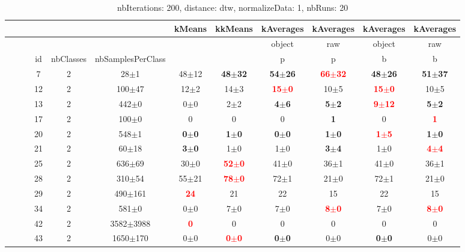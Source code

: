   
\begin{table} 
\begin{center} 
\small 
 \setlength{\tabcolsep}{.16667em} 
\begin{tabular}{lllccccccccc} 
 &  &  &  &  &  & kMeans & kkMeans & kAverages & kAverages & kAverages & kAverages \\ 
\hline 
 &  &  &  &  &  &  &  & object & raw & object & raw \\ 
 &  &  & id & nbClasses & nbSamplesPerClass &  &  & p & p & b & b \\ 
 &  &  &  7 & 2 &      28$\pm$1 & 48$\pm$12 & \textbf{48$\pm$32} & \textbf{54$\pm$26} & \textbf{\textcolor{red}{66$\pm$32}} & \textbf{48$\pm$26} & \textbf{51$\pm$37} \\ 
 &  &  & 12 & 2 &    100$\pm$47 & 12$\pm$2 & 14$\pm$3 & \textbf{\textcolor{red}{15$\pm$0}} & 10$\pm$5 & \textbf{\textcolor{red}{15$\pm$0}} & 10$\pm$5 \\ 
 &  &  & 13 & 2 &     442$\pm$0 &  0$\pm$0 &  2$\pm$2 & \textbf{ 4$\pm$6} & \textbf{ 5$\pm$2} & \textbf{\textcolor{red}{9$\pm$12}} & \textbf{ 5$\pm$2} \\ 
 &  &  & 17 & 2 &     100$\pm$0 & 0 & 0 & 0 & \textbf{1} & 0 & \textbf{\textcolor{red}{1}} \\ 
 &  &  & 20 & 2 &     548$\pm$1 & \textbf{0$\pm$0} & \textbf{1$\pm$0} & \textbf{0$\pm$0} & \textbf{1$\pm$0} & \textbf{\textcolor{red}{1$\pm$5}} & \textbf{1$\pm$0} \\ 
 &  &  & 21 & 2 &     60$\pm$18 & \textbf{3$\pm$0} & 1$\pm$0 & 1$\pm$0 & \textbf{3$\pm$4} & 1$\pm$0 & \textbf{\textcolor{red}{4$\pm$4}} \\ 
 &  &  & 25 & 2 &    636$\pm$69 & 30$\pm$0 & \textbf{\textcolor{red}{52$\pm$0}} & 41$\pm$0 & 36$\pm$1 & 41$\pm$0 & 36$\pm$1 \\ 
 &  &  & 28 & 2 &    310$\pm$54 & 55$\pm$21 & \textbf{\textcolor{red}{ 78$\pm$0}} &  72$\pm$1 &  21$\pm$0 &  72$\pm$1 &  21$\pm$0 \\ 
 &  &  & 29 & 2 &   490$\pm$161 & \textbf{\textcolor{red}{24}} & 21 & 22 & 15 & 22 & 15 \\ 
 &  &  & 34 & 2 &     581$\pm$0 & 0$\pm$0 & 7$\pm$0 & 7$\pm$0 & \textbf{\textcolor{red}{8$\pm$0}} & 7$\pm$0 & \textbf{\textcolor{red}{8$\pm$0}} \\ 
 &  &  & 42 & 2 & 3582$\pm$3988 & \textbf{\textcolor{red}{0}} & 0 & 0 & 0 & 0 & 0 \\ 
 &  &  & 43 & 2 &  1650$\pm$170 & 0$\pm$0 & \textbf{\textcolor{red}{0$\pm$0}} & \textbf{0$\pm$0} & 0$\pm$0 & \textbf{0$\pm$0} & 0$\pm$0 \\ 
\end{tabular} 
\end{center} 
\caption{nbIterations: 200, distance: dtw, normalizeData: 1, nbRuns: 20} 
\label{nbit200DidtNoda1Nbru20} 
\end{table} 
 
